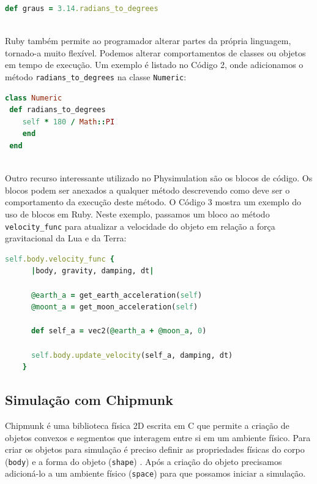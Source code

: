 \begin{lstlisting}[language=Ruby, caption=Conversão de radianos em graus]
  def graus = 3.14.radians_to_degrees
\end{lstlisting} 

\ \\ 
\hspace*{14pt} Ruby também permite ao programador alterar partes da própria linguagem, tornado-a muito flexível. Podemos alterar comportamentos de classes ou objetos 
em tempo de execução. Um exemplo é listado no Código 2, onde adicionamos o método {\tt radians\_to\_degrees} na classe {\tt Numeric}: 

\begin{lstlisting}[language=Ruby, caption=physics.rb ]
class Numeric
 def radians_to_degrees
    self * 180 / Math::PI
    end
 end
\end{lstlisting} 

\ \\
\hspace*{14pt} Outro recurso interessante utilizado no Physimulation são os blocos de código. Os blocos podem ser anexados a qualquer método descrevendo como deve ser 
o comportamento da execução deste método. O Código 3 mostra um exemplo do uso de blocos em Ruby. Neste exemplo, passamos um bloco ao método {\tt velocity\_func} para atualizar a velocidade do objeto em relação a força gravitacional da Lua e da Terra:

\begin{lstlisting}[language=Ruby, caption=RocketSimulation.rb]
    self.body.velocity_func { 
      |body, gravity, damping, dt|

      @earth_a = get_earth_acceleration(self)
      @moont_a = get_moon_acceleration(self)

      def self_a = vec2(@earth_a + @moon_a, 0)

      self.body.update_velocity(self_a, damping, dt)
    }
\end{lstlisting}

\subsection{Simulação com Chipmunk}
Chipmunk é uma biblioteca física 2D escrita em C que permite a criação de objetos convexos e segmentos que interagem entre si em um ambiente físico. Para criar os 
objetos para simulação é preciso definir as propriedades físicas do corpo ({\tt body}) e a forma do objeto ({\tt shape}) . Após a criação do objeto precisamos adicioná-lo a um ambiente físico ({\tt space}) para que possamos
iniciar a simulação.\\

